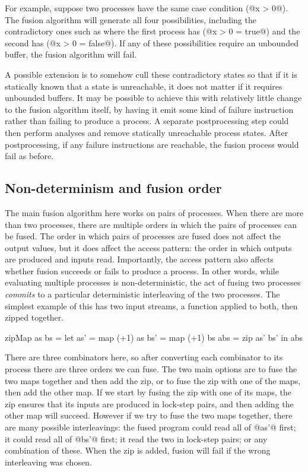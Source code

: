 For example, suppose two processes have the same case condition (@x > 0@).
The fusion algorithm will generate all four possibilities, including the contradictory ones such as where the first process has (@x > 0 = true@) and the second has (@x > 0 = false@).
If any of these possibilities require an unbounded buffer, the fusion algorithm will fail.

A possible extension is to somehow cull these contradictory states so that if it is statically known that a state is unreachable, it does not matter if it requires unbounded buffers.
It may be possible to achieve this with relatively little change to the fusion algorithm itself, by having it emit some kind of failure instruction rather than failing to produce a process.
A separate postprocessing step could then perform analyses and remove statically unreachable process states.
After postprocessing, if any failure instructions are reachable, the fusion process would fail as before.

\subsection{Non-determinism and fusion order}
\label{s:FusionOrder}

The main fusion algorithm here works on pairs of processes.
When there are more than two processes, there are multiple orders in which the pairs of processes can be fused.
The order in which pairs of processes are fused does not affect the output values, but it does affect the access pattern: the order in which outputs are produced and inputs read.
Importantly, the access pattern also affects whether fusion succeeds or fails to produce a process.
In other words, while evaluating multiple processes is non-deterministic, the act of fusing two processes \emph{commits} to a particular deterministic interleaving of the two processes.
The simplest example of this has two input streams, a function applied to both, then zipped together. 

\begin{code}
zipMap as bs =
  let as' = map (+1) as
      bs' = map (+1) bs
      abs = zip as' bs'
  in  abs
\end{code}

There are three combinators here, so after converting each combinator to its process there are three orders we can fuse.
The two main options are to fuse the two maps together and then add the zip, or to fuse the zip with one of the maps, then add the other map.
If we start by fusing the zip with one of its maps, the zip ensures that its inputs are produced in lock-step pairs, and then adding the other map will succeed.
However if we try to fuse the two maps together, there are many possible interleavings: the fused program could read all of @as'@ first; it could read all of @bs'@ first; it read the two in lock-step pairs; or any combination of these.
When the zip is added, fusion will fail if the wrong interleaving was chosen.

